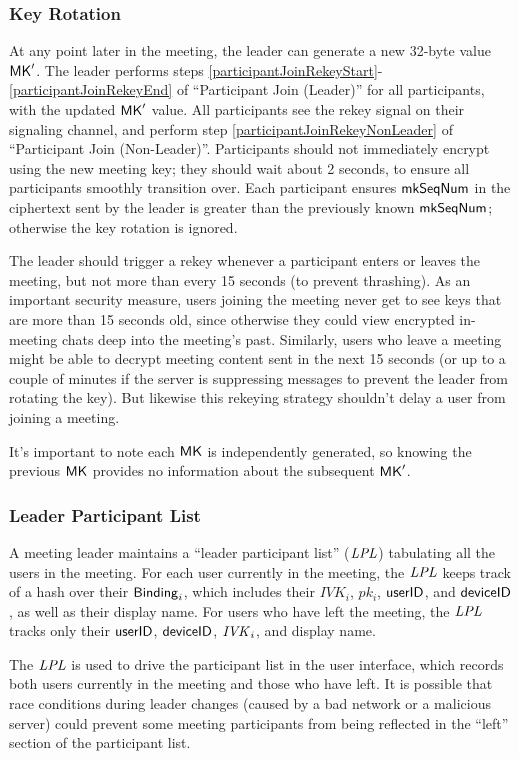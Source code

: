 \subsubsection{Key Rotation}
\label{subsubsec:keyrotation}
At any point later in the meeting, the leader can generate a new 32-byte value ${\sf MK}'$. The leader
performs steps \ref{participantJoinRekeyStart}-\ref{participantJoinRekeyEnd} of ``Participant Join
(Leader)'' for all participants, with the updated ${\sf MK}'$ value. All participants see the rekey
signal on their signaling channel, and perform step \ref{participantJoinRekeyNonLeader} of
``Participant Join (Non-Leader)''. Participants should not immediately encrypt using the new meeting
key; they should wait about 2 seconds, to ensure all participants smoothly transition over. Each
participant ensures $\mathsf{mkSeqNum}$ in the ciphertext sent by the leader is greater than the
previously known $\mathsf{mkSeqNum}$; otherwise the key rotation is ignored.

The leader should trigger a rekey whenever a participant enters or leaves the meeting, but not more
than every 15 seconds (to prevent thrashing). As an important security measure, users joining the
meeting never get to see keys that are more than 15 seconds old, since otherwise they could view
encrypted in-meeting chats deep into the meeting's past. Similarly, users who leave a meeting might
be able to decrypt meeting content sent in the next 15 seconds (or up to a couple of minutes if the
server is suppressing messages to prevent the leader from rotating the key). But likewise this
rekeying strategy shouldn't delay a user from joining a meeting.

It's important to note each ${\sf MK}$ is independently generated, so knowing the previous ${\sf MK}$ provides no information about the subsequent ${\sf MK}'$.

\subsubsection{Leader Participant List}

A meeting leader maintains a ``leader participant list'' ($\mathit{LPL}$) tabulating all the users in the meeting. For each user currently in the meeting, the $\mathit{LPL}$ keeps track of a hash over their ${\sf Binding}_i$, which includes their $IVK_i$, $pk_i$, $\mathsf{userID}$, and ${\sf deviceID}$, as well as their display name. For users who have left the meeting, the $\mathit{LPL}$ tracks only their $\mathsf{userID}$, ${\sf deviceID}$, $\mathit{IVK}_i$, and display name.

The $\mathit{LPL}$ is used to drive the participant list in the user interface, which records both users
currently in the meeting and those who have left. It is possible that race conditions during leader
changes (caused by a bad network or a malicious server) could prevent some meeting participants from
being reflected in the ``left'' section of the participant list.

